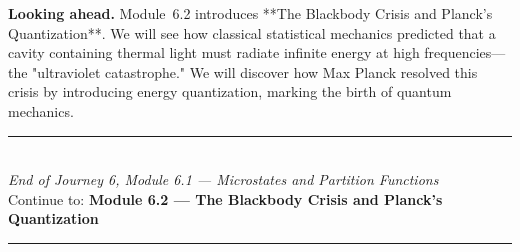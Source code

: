 \documentclass[12pt, a4paper, twoside]{book}
\begin{document}
\medskip
\noindent\textbf{Looking ahead.}
Module~6.2 introduces **The Blackbody Crisis and Planck's Quantization**. We will see how classical statistical mechanics predicted that a cavity containing thermal light must radiate infinite energy at high frequencies—the "ultraviolet catastrophe." We will discover how Max Planck resolved this crisis by introducing energy quantization, marking the birth of quantum mechanics.

\vspace{1.4cm}
\begin{center}
{\color{teal}\rule{0.5\linewidth}{0.8pt}}\\[6pt]
{\small\color{deep}\textit{End of Journey 6, Module 6.1 --- Microstates and Partition Functions}}\\[4pt]
{\small\color{deep}Continue to: \textbf{Module 6.2 --- The Blackbody Crisis and Planck's Quantization}}\\[6pt]
{\color{teal}\rule{0.5\linewidth}{0.8pt}}
\end{center}
\end{document}
